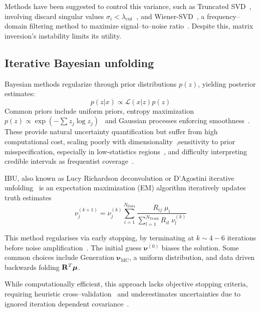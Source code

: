 Methods have been suggested to control this variance, such as Truncated SVD~\cite{deng_fast_2024}, involving discard singular values \(\sigma_i < \lambda_{\text{cut}}\)~\cite{TruncatedSVDDocumentation}, and Wiener-SVD~\cite{tang_data_2017}, a frequency--domain filtering method to maximize signal--to--noise ratio~\cite{zaroubi_wiener_1995}.
%
Despite this, matrix inversion's instability limits its utility.

\subsection{Iterative Bayesian unfolding}
Bayesian methods regularize through prior distributions \(p(z)\), yielding posterior estimates:  
\begin{equation}
    p({z}|{x}) \propto \mathcal{L}({x}|{z})p({z})
\end{equation}  
Common priors include uniform priors, entropy maximization \(p(z) \propto \exp(-\sum z_j \log z_j)\)~\cite{maeda_new_2013} and Gaussian processes enforcing smoothness~\cite{bozson_unfolding_2018}.
%
These provide natural uncertainty quantification but suffer from high computational cost, scaling poorly with dimensionality~\cite{cowan_bayesian_2007},sensitivity to prior misspecification, especially in low-statistics regions~\cite{cowan_bayesian_2006}, and difficulty interpreting credible intervals as frequentist coverage~\cite{james_statistics_2004}.

IBU, also known as Lucy Richardson deconvolution or D'Agostini iterative unfolding~\cite{dagostini_improved_2010} is an expectation maximization (EM) algorithm iteratively updates truth estimates
\begin{equation}
    \nu_j^{(k+1)} = \nu_j^{(k)} \sum_{i=1}^{N_{\text{Data}}} \frac{R_{ij}\; \mu_i}{\sum_{l=1}^{N_{\text{Truth}}} R_{il} \;\nu_l^{(k)}}
\end{equation}  

This method regularises via early stopping, by terminating at \(k \sim 4-6\) iterations before noise amplification~\cite{fish_blind_1995, shepp_maximum_1982}.
%
The initial guess \(\boldsymbol{\nu}^{(0)}\) biases the solution.
%
Some common choices include Generation \(\boldsymbol{\nu}_{\text{MC}}\), a uniform distribution, and data driven backwards folding \(\mathbf{R}^T \vb*{\mu}\).

 While computationally efficient, this approach lacks objective stopping criteria, requiring heuristic cross--validation~\cite{cowan_survey_2002} and underestimates uncertainties due to ignored iteration dependent covariance~\cite{cowan_statistical_1998}.

